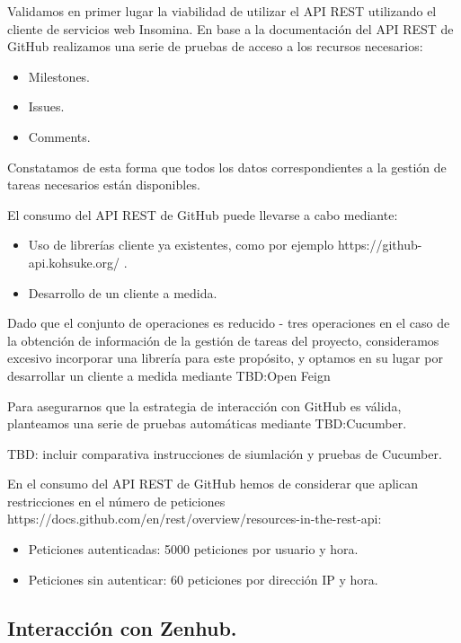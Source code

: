 Validamos en primer lugar la viabilidad de utilizar el API REST utilizando  el cliente de servicios web Insomina. En base a la documentación del API REST de GitHub realizamos una serie de pruebas de acceso a los recursos necesarios:

\begin{itemize}
  \item Milestones.
  \item Issues.
  \item Comments.
\end{itemize}

Constatamos de esta forma que todos los datos correspondientes a la gestión de tareas necesarios están disponibles.

El consumo del API REST de GitHub puede llevarse a cabo mediante:

\begin{itemize}
  \item Uso de librerías cliente ya existentes, como por ejemplo https://github-api.kohsuke.org/ .
  \item Desarrollo de un cliente a medida.
\end{itemize}

Dado que el conjunto de operaciones es reducido - tres operaciones en el caso de la obtención de información de la gestión de tareas del proyecto, consideramos excesivo incorporar una librería para este propósito, y optamos en su lugar por desarrollar un cliente a medida mediante TBD:Open Feign

Para asegurarnos que la estrategia de interacción con GitHub es válida, planteamos una serie de pruebas automáticas mediante TBD:Cucumber.

TBD: incluir comparativa instrucciones de siumlación y pruebas de Cucumber.

En el consumo del API REST de GitHub hemos de considerar que aplican restricciones en el número de peticiones https://docs.github.com/en/rest/overview/resources-in-the-rest-api:

\begin{itemize}
  \item Peticiones autenticadas: 5000 peticiones por usuario y hora.
  \item Peticiones sin autenticar: 60 peticiones por dirección IP y hora.
\end{itemize}

\subsection{Interacción con Zenhub.}

